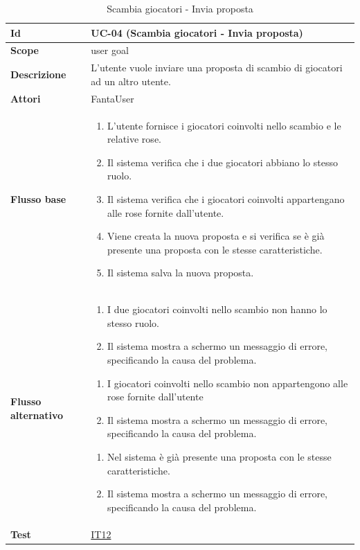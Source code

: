 \begin{table}[H]
\caption{Scambia giocatori - Invia proposta}
\label{UC-04}

\begin{tabularx}{\textwidth}{|l|X|}
\hline
\textbf{Id} & UC-04 (Scambia giocatori - Invia proposta) \\
\hline
\textbf{Scope} & user goal \\
\hline
\textbf{Descrizione} & L'utente vuole inviare una proposta di scambio di giocatori ad un altro utente. \\
\hline
\textbf{Attori} & FantaUser \\
\hline
\textbf{Flusso base} &
\begin{enumerate}[leftmargin=*]
    \item L'utente fornisce i giocatori coinvolti nello scambio e le relative rose.
    \item Il sistema verifica che i due giocatori abbiano lo stesso ruolo.
    \item Il sistema verifica che i giocatori coinvolti appartengano alle rose fornite dall'utente.
    \item Viene creata la nuova proposta e si verifica se è già presente una 
            proposta con le stesse caratteristiche.
    \item Il sistema salva la nuova proposta.
\end{enumerate} \\
\hline
\textbf{Flusso alternativo} &
\begin{enumerate}[leftmargin=*,label=2.\arabic*]
    \item I due giocatori coinvolti nello scambio non hanno lo stesso ruolo.
    \item Il sistema mostra a schermo un messaggio di errore, specificando la causa del problema.
\end{enumerate}
\begin{enumerate}[leftmargin=*,label=3.\arabic*]
    \item I giocatori coinvolti nello scambio non appartengono alle rose fornite dall'utente
    \item Il sistema mostra a schermo un messaggio di errore, specificando la causa del problema.
\end{enumerate} 
\begin{enumerate}[leftmargin=*,label=4.\arabic*]
    \item Nel sistema è già presente una proposta con le stesse caratteristiche.
    \item Il sistema mostra a schermo un messaggio di errore, specificando la causa del problema.
\end{enumerate} \\
\hline
\textbf{Test} & \hyperref[IT12]{IT12} \\
\hline
\end{tabularx}

\end{table}



